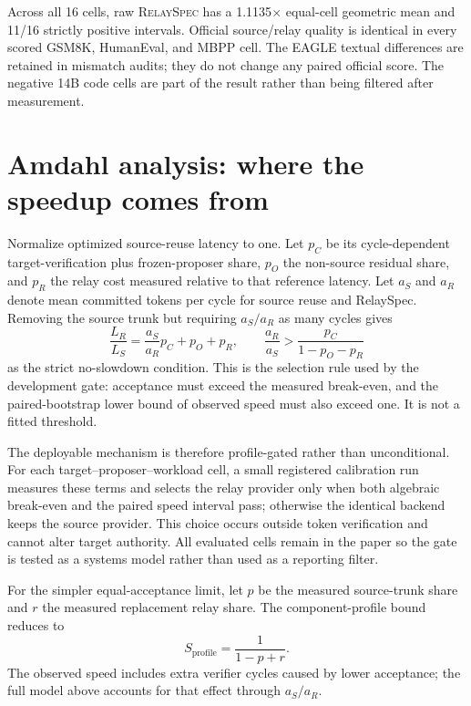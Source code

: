 \documentclass[10pt]{article}
\newcommand{\method}{\textsc{RelaySpec}}
\begin{document}
Across all 16 cells, raw \method{} has a 1.1135$\times$ equal-cell geometric
mean and 11/16 strictly positive intervals. Official source/relay quality is
identical in every scored GSM8K, HumanEval, and MBPP cell. The EAGLE textual
differences are retained in mismatch audits; they do not change any paired
official score. The negative 14B code cells are part of the result rather than
being filtered after measurement.

\section{Amdahl analysis: where the speedup comes from}

Normalize optimized source-reuse latency to one. Let $p_C$ be its
cycle-dependent target-verification plus frozen-proposer share, $p_O$ the
non-source residual share, and $p_R$ the relay cost measured relative to that
reference latency. Let $a_S$ and $a_R$ denote mean committed tokens per cycle
for source reuse and RelaySpec. Removing the source trunk but requiring
$a_S/a_R$ as many cycles gives
\begin{equation}
\frac{L_R}{L_S}=\frac{a_S}{a_R}p_C+p_O+p_R,
\qquad
\frac{a_R}{a_S}>\frac{p_C}{1-p_O-p_R}
\end{equation}
as the strict no-slowdown condition. This is the selection rule used by the
development gate: acceptance must exceed the measured break-even, and the
paired-bootstrap lower bound of observed speed must also exceed one. It is not
a fitted threshold.

The deployable mechanism is therefore profile-gated rather than unconditional.
For each target--proposer--workload cell, a small registered calibration run
measures these terms and selects the relay provider only when both algebraic
break-even and the paired speed interval pass; otherwise the identical backend
keeps the source provider. This choice occurs outside token verification and
cannot alter target authority. All evaluated cells remain in the paper so the
gate is tested as a systems model rather than used as a reporting filter.

For the simpler equal-acceptance limit, let $p$ be the measured source-trunk
share and $r$ the measured replacement relay share. The component-profile
bound reduces to
\begin{equation}
S_{\mathrm{profile}}=\frac{1}{1-p+r}.
\end{equation}
The observed speed includes extra verifier cycles caused by lower acceptance;
the full model above accounts for that effect through $a_S/a_R$.
\end{document}
